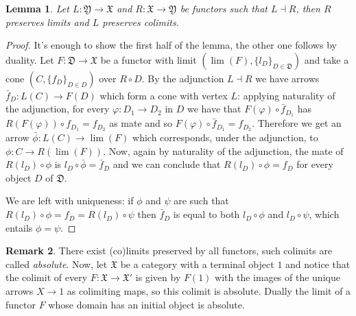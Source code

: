 \documentclass[12pt]{article}
\newtheorem{lemma}{Lemma}[section]
\theoremstyle{definition}
\newtheorem{remark}[lemma]{Remark}
\def\D{\mathfrak D}
\def\X{\mathfrak X}
\def\Y{\mathfrak Y}
\numberwithin{equation}{section}
\begin{document}
 \begin{lemma}\label{adj} Let $L:\Y\rightarrow \X$ and $R:\X\rightarrow \Y$ be functors such that $L\dashv R$, then $R$ preserves limits and $L$ preserves colimits.
 \end{lemma}
\begin{proof}It's enough to show the first half of the lemma, the other one follows by duality. Let $F:\D\rightarrow \X$ be a functor with limit $(\lim(F), \{l_{D}\}_{D\in \D})$ and take a cone $(C, \{f_D\}_{D\in D})$ over $R\circ D$. By the adjunction $L\dashv R$ we have arrows $\bar{f}_D:L(C)\rightarrow F(D)$ which form a cone with vertex $L$: applying naturality of the adjunction, for every $\varphi:D_1\rightarrow D_2$ in $D$ we have that
$F(\varphi)\circ \bar{f}_{D_1}$ has $R(F(\varphi))\circ f_{D_1}=f_{D_2}$ as mate and so $F(\varphi)\circ \bar{f}_{D_1}=f_{D_2}$. Therefore we get an arrow $\bar{\phi}:L(C)\rightarrow \lim(F)$ which corresponds, under the adjunction, to $\phi:C\rightarrow R(\lim(F))$. Now, again by naturality of the adjunction, the mate of $R(l_D)\circ \phi$ is $l_D\circ \bar{\phi}=\bar{f}_D$ and we can conclude that $R(l_D)\circ \phi=f_D$ for every object $D$ of $\D$.

We are left with  uniqueness: if $\phi$ and $\psi$ are such that $R(l_D)\circ \phi=f_D=R(l_D)\circ \psi$ then $\bar{f}_D$ is equal to both $l_D\circ \phi$ and $l_D\circ \psi$, which entails $\phi=\psi$.
\end{proof}
 
 \begin{remark}\label{absolute}
 	There exist (co)limits preserved by all functors, such colimits are called \emph{absolute}. Now, let $\X$ be a category with a terminal object $1$ and notice that the colimit of every $F:\X\rightarrow \X'$ is given by $F(1)$ with  the images of the unique arrows $X\rightarrow 1$ as colimiting maps, so this colimit is absolute. Dually the limit of a functor $F$ whose domain has an initial object  is absolute. 
 \end{remark}
 
\end{document}
